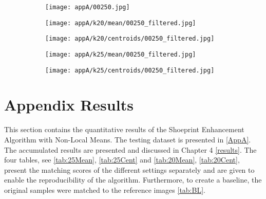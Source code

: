 \documentclass[draft,final]{vutinfth} %
\begin{document}
\begin{appendices}
\begin{figure}[h]
\centering
  \begin{subfigure}[t]{0.19\columnwidth}
    \centering
    \texttt{[image: appA/00250.jpg]}
  \end{subfigure}
  \begin{subfigure}[t]{0.19\columnwidth}
    \centering
    \texttt{[image: appA/k20/mean/00250\_filtered.jpg]}
  \end{subfigure}
  \begin{subfigure}[t]{0.19\columnwidth}
    \centering
    \texttt{[image: appA/k20/centroids/00250\_filtered.jpg]}
  \end{subfigure}
  \begin{subfigure}[t]{0.19\columnwidth}
    \centering
    \texttt{[image: appA/k25/mean/00250\_filtered.jpg]}
  \end{subfigure}
  \begin{subfigure}[t]{0.19\columnwidth}
    \centering
    \texttt{[image: appA/k25/centroids/00250\_filtered.jpg]}
  \end{subfigure}
\caption{}
\end{figure}  

\chapter{Appendix Results}
\label{AppB}
		This section contains the quantitative results of the Shoeprint Enhancement Algorithm with Non-Local Means.
		The testing dataset is presented in \ref{AppA}.
		The accumulated results are presented and discussed in Chapter 4 \ref{results}.
		The four tables, see \ref{tab:25Mean}, \ref{tab:25Cent} and \ref{tab:20Mean}, \ref{tab:20Cent}, present the matching scores of the different settings separately and are given to enable the reproducibility of the algorithm.
		Furthermore, to create a baseline, the original samples were matched to the reference images \ref{tab:BL}.


\end{appendices}
\end{document}
